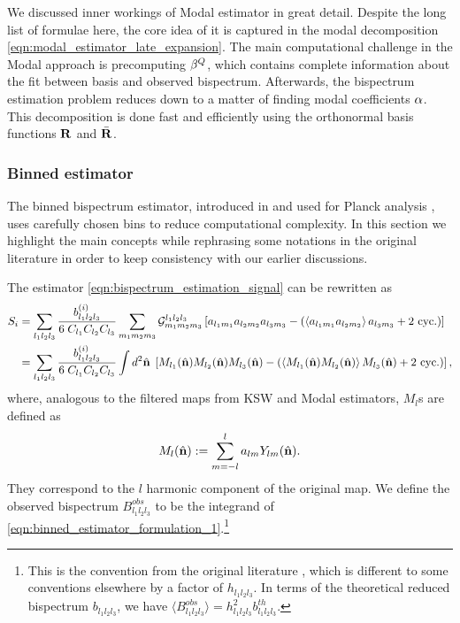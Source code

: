 \hspace{10pt}

We discussed inner workings of Modal estimator in great detail. Despite the long list of formulae here, the core idea of it is captured in the modal decomposition \eqref{eqn:modal_estimator_late_expansion}. The main computational challenge in the Modal approach is precomputing $\mathbf{\beta}^Q$, which contains complete information about the fit between basis and observed bispectrum. Afterwards, the bispectrum estimation problem reduces down to a matter of finding modal coefficients $\mathbf{\alpha}$. This decomposition is done fast and efficiently using the orthonormal basis functions $\mathbf{R}$ and $\bar{\mathbf{R}}$.

\subsubsection*{Binned estimator}

The binned bispectrum estimator, introduced in \cite{Bucher2010} and used for Planck analysis \cite{PlanckCollaboration2013,PlanckCollaboration2015,PlanckCollaboration2018,Bucher2016}, uses carefully chosen bins to reduce computational complexity. In this section we highlight the main concepts while rephrasing some notations in the original literature \cite{Bucher2010} in order to keep consistency with our earlier discussions.

The estimator \eqref{eqn:bispectrum_estimation_signal} can be rewritten as 
\begin{align}
	S_i &= \sum_{l_1 l_2 l_3}  \frac{b^{(i)}_{l_1 l_2 l_3}}{6 \; C_{l_1} C_{l_2} C_{l_3}} \sum_{m_1 m_2 m_3} \mathcal{G}^{l_1 l_2 l_3}_{m_1 m_2 m_3} \left[ a_{l_1 m_1} a_{l_2 m_2} a_{l_3 m_3} - \left( \left< a_{l_1 m_1} a_{l_2 m_2} \right> a_{l_3 m_3} + \text{2 cyc.} \right) \right] \\
	&= \sum_{l_1 l_2 l_3}  \frac{b^{(i)}_{l_1 l_2 l_3}}{6 \; C_{l_1} C_{l_2} C_{l_3}} \int d^2 \hat{\mathbf{n}} \; \left[ M_{l_1} (\hat{\mathbf{n}}) M_{l_2} (\hat{\mathbf{n}}) M_{l_3} (\hat{\mathbf{n}}) - \left( \left< M_{l_1} (\hat{\mathbf{n}}) M_{l_2} (\hat{\mathbf{n}}) \right> M_{l_3} (\hat{\mathbf{n}}) + \text{2 cyc.}\right)  \right], \label{eqn:binned_estimator_formulation_1}
\end{align}
where, analogous to the filtered maps from KSW and Modal estimators, $M_l$s are defined as
\begin{align}
	M_l(\hat{\mathbf{n}}) := \sum_{m=-l}^{l} a_{lm} Y_{lm}(\hat{\mathbf{n}}).
\end{align}
They correspond to the $l$ harmonic component of the original map. We define the observed bispectrum $B^{obs}_{l_1 l_2 l_3}$ to be the integrand of \eqref{eqn:binned_estimator_formulation_1}.\footnote{This is the convention from the original literature \cite{Bucher2010}, which is different to some conventions elsewhere by a factor of $h_{l_1 l_2 l_3}$. In terms of the theoretical reduced bispectrum $b_{l_1 l_2 l_3}$, we have $\langle B^{obs}_{l_1 l_2 l_3} \rangle = h^2_{l_1 l_2 l_3} b^{th}_{l_1 l_2 l_3}$.}

